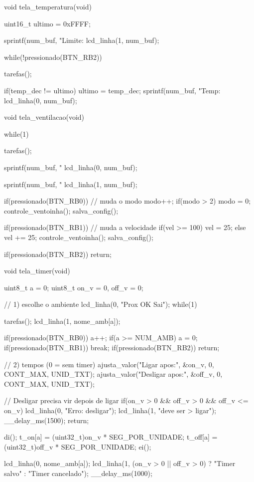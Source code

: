 void tela_temperatura(void)
{
    uint16_t ultimo = 0xFFFF;

    sprintf(num_buf, "Limite: %
    lcd_linha(1, num_buf);

    while(!pressionado(BTN_RB2))
    {
        tarefas();

        if(temp_dec != ultimo)
        {
            ultimo = temp_dec;
            sprintf(num_buf, "Temp: %
            lcd_linha(0, num_buf);
        }
    }
}

void tela_ventilacao(void)
{
    while(1)
    {
        tarefas();

        sprintf(num_buf, "%
        lcd_linha(0, num_buf);

        sprintf(num_buf, "%
        lcd_linha(1, num_buf);

        if(pressionado(BTN_RB0))        // muda o modo
        {
            modo++;
            if(modo > 2) modo = 0;
            controle_ventoinha();
            salva_config();
        }

        if(pressionado(BTN_RB1))        // muda a velocidade
        {
            if(vel >= 100) vel = 25;
            else vel += 25;
            controle_ventoinha();
            salva_config();
        }

        if(pressionado(BTN_RB2))
            return;
    }
}

void tela_timer(void)
{
    uint8_t a = 0;
    uint8_t on_v = 0, off_v = 0;

    // 1) escolhe o ambiente
    lcd_linha(0, "Prox    OK   Sai");
    while(1)
    {
        tarefas();
        lcd_linha(1, nome_amb[a]);

        if(pressionado(BTN_RB0))
        {
            a++;
            if(a >= NUM_AMB) a = 0;
        }
        if(pressionado(BTN_RB1))
            break;
        if(pressionado(BTN_RB2))
            return;
    }

    // 2) tempos (0 = sem timer)
    ajusta_valor("Ligar apos:", &on_v, 0, CONT_MAX, UNID_TXT);
    ajusta_valor("Desligar apos:", &off_v, 0, CONT_MAX, UNID_TXT);

    // Desligar precisa vir depois de ligar
    if(on_v > 0 && off_v > 0 && off_v <= on_v)
    {
        lcd_linha(0, "Erro: desligar");
        lcd_linha(1, "deve ser > ligar");
        __delay_ms(1500);
        return;
    }

    di();
    t_on[a]  = (uint32_t)on_v  * SEG_POR_UNIDADE;
    t_off[a] = (uint32_t)off_v * SEG_POR_UNIDADE;
    ei();

    lcd_linha(0, nome_amb[a]);
    lcd_linha(1, (on_v > 0 || off_v > 0) ? "Timer salvo" : "Timer cancelado");
    __delay_ms(1000);
}

